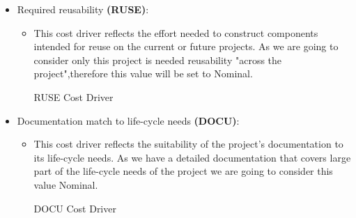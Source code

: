 \begin{itemize}
	\item Required reusability \textbf{(RUSE)}: 
	\begin{itemize}
	\item[] This cost driver reflects the effort needed to construct components intended for reuse on the current or future projects. As we are going to consider only this project is needed reusability "across the project",therefore this value will be set to \textsf{Nominal}.
	\begin{costdriverstable}{RUSE Cost Driver}
		\hline
	\end{costdriverstable}
	\end{itemize}
\end{itemize}

\begin{itemize}
	\item Documentation match to life-cycle needs \textbf{(DOCU)}: 
	\begin{itemize}
	\item[]This cost driver reflects  the suitability of the project's documentation to its life-cycle needs. As we have a detailed documentation that covers large part of the life-cycle needs of the project we are going to consider this value \textsf{Nominal}.
	\begin{costdriverstable}{DOCU Cost Driver}
		\hline
	\end{costdriverstable}
	\end{itemize}
\end{itemize}

